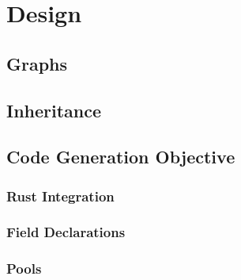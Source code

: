 \chapter{Design}

\section{Graphs}

\section{Inheritance}

\section{Code Generation Objective}
  \subsection{Rust Integration}
  \subsection{Field Declarations}
  \subsection{Pools}
